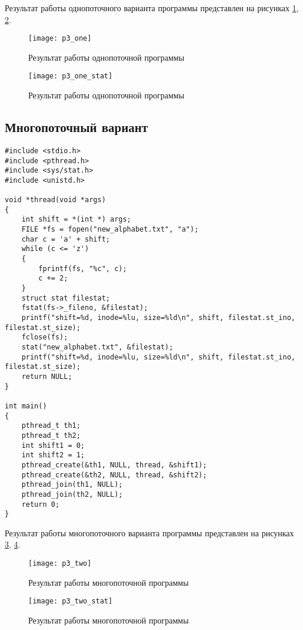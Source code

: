 Результат работы однопоточного варианта программы представлен на рисунках \ref{p3_one}, \ref{p3_one_stat}.

\begin{figure}[ht!]
	\centering
	\texttt{[image: p3\_one]}
	\caption{Результат работы однопоточной программы}
	\label{p3_one}
\end{figure}

\begin{figure}[ht!]
	\centering
	\texttt{[image: p3\_one\_stat]}
	\caption{Результат работы однопоточной программы}
	\label{p3_one_stat}
\end{figure}

\subsection*{Многопоточный вариант}

\begin{lstlisting}[caption=Многопоточный вариант]
#include <stdio.h>
#include <pthread.h>
#include <sys/stat.h>
#include <unistd.h>

void *thread(void *args)
{
	int shift = *(int *) args;
	FILE *fs = fopen("new_alphabet.txt", "a");
	char c = 'a' + shift;
	while (c <= 'z')
	{
		fprintf(fs, "%c", c);
		c += 2;
	}
	struct stat filestat;
	fstat(fs->_fileno, &filestat);
	printf("shift=%d, inode=%lu, size=%ld\n", shift, filestat.st_ino, filestat.st_size);
	fclose(fs);
	stat("new_alphabet.txt", &filestat);
	printf("shift=%d, inode=%lu, size=%ld\n", shift, filestat.st_ino, filestat.st_size);
	return NULL;
}

int main()
{
	pthread_t th1;
	pthread_t th2;
	int shift1 = 0;
	int shift2 = 1;
	pthread_create(&th1, NULL, thread, &shift1);
	pthread_create(&th2, NULL, thread, &shift2);
	pthread_join(th1, NULL);
	pthread_join(th2, NULL);
	return 0;
}
\end{lstlisting}

Результат работы многопоточного варианта программы представлен на рисунках \ref{p3_two}, \ref{p3_two_stat}.

\begin{figure}[ht!]
	\centering
	\texttt{[image: p3\_two]}
	\caption{Результат работы многопоточной программы}
	\label{p3_two}
\end{figure}

\begin{figure}[ht!]
	\centering
	\texttt{[image: p3\_two\_stat]}
	\caption{Результат работы многопоточной программы}
	\label{p3_two_stat}
\end{figure}

